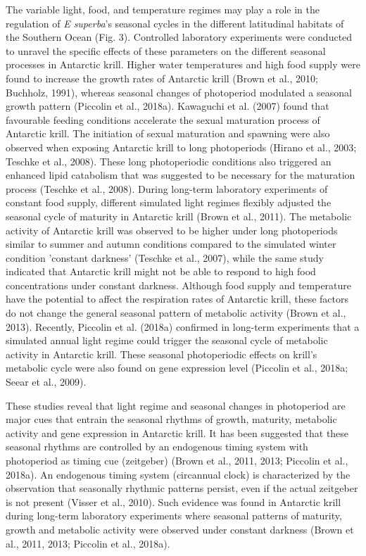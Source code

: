 The variable light, food, and temperature regimes may play a role in the regulation of \textit{E superba}'s seasonal cycles in the different latitudinal habitats of the Southern Ocean (Fig. 3). Controlled laboratory experiments were conducted to unravel the specific effects of these parameters on the different seasonal processes in Antarctic krill. Higher water temperatures and high food supply were found to increase the growth rates of Antarctic krill (Brown et al., 2010; Buchholz, 1991), whereas seasonal changes of photoperiod modulated a seasonal growth pattern (Piccolin et al., 2018a). Kawaguchi et al. (2007) found that favourable feeding conditions accelerate the sexual maturation process of Antarctic krill. The initiation of sexual maturation and spawning were also observed when exposing Antarctic krill to long photoperiods (Hirano et al., 2003; Teschke et al., 2008). These long photoperiodic conditions also triggered an enhanced lipid catabolism that was suggested to be necessary for the maturation process (Teschke et al., 2008). During long-term laboratory experiments of constant food supply, different simulated light regimes flexibly adjusted the seasonal cycle of maturity in Antarctic krill (Brown et al., 2011). The metabolic activity of Antarctic krill was observed to be higher under long photoperiods similar to summer and autumn conditions compared to the simulated winter condition 'constant darkness' (Teschke et al., 2007), while the same study indicated that Antarctic krill might not be able to respond to high food concentrations under constant darkness. Although food supply and temperature have the potential to affect the respiration rates of Antarctic krill, these factors do not change the general seasonal pattern of metabolic activity (Brown et al., 2013). Recently, Piccolin et al. (2018a) confirmed in long-term experiments that a simulated annual light regime could trigger the seasonal cycle of metabolic activity in Antarctic krill. These seasonal photoperiodic effects on krill's metabolic cycle were also found on gene expression level (Piccolin et al., 2018a; Seear et al., 2009). 

These studies reveal that light regime and seasonal changes in photoperiod are major cues that entrain the seasonal rhythms of growth, maturity, metabolic activity and gene expression in Antarctic krill. It has been suggested that these seasonal rhythms are controlled by an endogenous timing system with photoperiod as timing cue (zeitgeber) (Brown et al., 2011, 2013; Piccolin et al., 2018a). An endogenous timing system (circannual clock) is characterized by the observation that seasonally rhythmic patterns persist, even if the actual zeitgeber is not present (Visser et al., 2010). Such evidence was found in Antarctic krill during long-term laboratory experiments where seasonal patterns of maturity, growth and metabolic activity were observed under constant darkness (Brown et al., 2011, 2013; Piccolin et al., 2018a).

